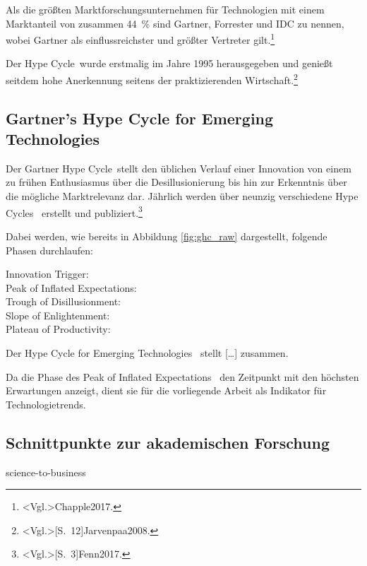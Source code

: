 Als die größten Marktforschungsunternehmen für Technologien mit einem Marktanteil von zusammen 44~\% sind Gartner, Forrester und IDC zu nennen, wobei Gartner als einflussreichster und größter Vertreter gilt.\footnote{\citeNP<Vgl.>{Chapple2017}.}

Der \glqq Hype Cycle\grqq~wurde erstmalig im Jahre 1995 herausgegeben und genießt seitdem hohe Anerkennung seitens der praktizierenden Wirtschaft.\footnote{\citeNP<Vgl.>[S.~12]{Jarvenpaa2008}.}

\subsection{Gartner’s Hype Cycle for Emerging Technologies}
Der \glqq Gartner Hype Cycle\grqq~stellt den üblichen Verlauf einer Innovation von einem zu frühen Enthusiasmus über die Desillusionierung bis hin zur Erkenntnis über die mögliche Marktrelevanz dar. Jährlich werden über neunzig verschiedene \glqq Hype Cycles\grqq~ erstellt und publiziert.\footnote{\citeNP<Vgl.>[S.~3]{Fenn2017}.}

Dabei werden, wie bereits in Abbildung \ref{fig:ghc_raw} dargestellt, folgende Phasen durchlaufen:
\begin{description}
	\item[Innovation Trigger:] 
	\item[Peak of Inflated Expectations:] 
	\item[Trough of Disillusionment:] 
	\item[Slope of Enlightenment:] 
	\item[Plateau of Productivity:] 
\end{description}

Der \glqq Hype Cycle for Emerging Technologies\grqq~ stellt [\dots] zusammen.

Da die Phase des \glqq Peak of Inflated Expectations\grqq~ den Zeitpunkt mit den höchsten Erwartungen anzeigt, dient sie für die vorliegende Arbeit als Indikator für Technologietrends.

\subsection{Schnittpunkte zur akademischen Forschung}
science-to-business